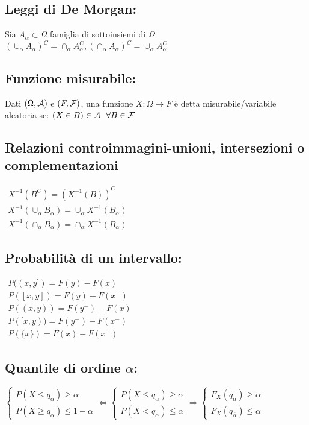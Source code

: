 
\subsection{Leggi di De Morgan:}

Sia $A_{\alpha} \subset \Omega $ famiglia di sottoinsiemi di $\Omega $ $( \cup_{\alpha} A_{\alpha})^C =\cap_{\alpha} A^C_{\alpha} ,( \cap_{\alpha} A_{\alpha})^C =\cup_{\alpha} A^C_{\alpha}$
\subsection{Funzione misurabile:}

Dati $(\Omega ,\mathcal A )$ e $(F,\mathcal F )$, una funzione $X:\Omega \rightarrow F$ è detta misurabile/variabile aleatoria se: $(X\in B)\in \mathcal A \ \ \forall B\in \mathcal F$
\subsection{Relazioni controimmagini-unioni, intersezioni o complementazioni}

$ \begin{array}{l}
X^{-1}\left( B^C\right) =\left( X^{-1} (B)\right)^C\\
X^{-1}( \cup_{\alpha} B_{\alpha}) =\cup_{\alpha} X^{-1}( B_{\alpha})\\
X^{-1}( \cap_{\alpha} B_{\alpha}) =\cap_{\alpha} X^{-1}( B_{\alpha})
\end{array}$
\subsection{Probabilità di un intervallo:}

$ \begin{array}{l}
P((x,y]) = F(y)   - F(x)   \\
P([x,y]) = F(y)   - F(x^-) \\
P((x,y)) = F(y^-) - F(x)   \\
P([x,y)) = F(y^-) - F(x^-) \\
P(\{x\}) = F(x)   - F(x^-)
\end{array}$
\subsection{Quantile di ordine $\alpha $:}

$\begin{cases}
P( X\leq q_{\alpha}) \geq \alpha \\
P( X\geq q_{\alpha}) \leq 1-\alpha 
\end{cases} \Leftrightarrow \begin{cases}
P( X\leq q_{\alpha}) \geq \alpha \\
P( X< q_{\alpha}) \leq \alpha 
\end{cases} \Rightarrow \begin{cases}
F_X( q_{\alpha}) \geq \alpha \\
F_X( q_{\overline{\alpha}}) \leq \alpha 
\end{cases}$
